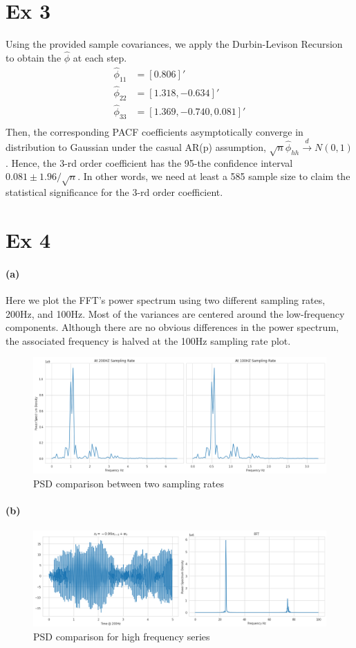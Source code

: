 \documentclass[11pt, letterpaper]{article}
\begin{document}
\section{Ex 3}
Using the provided sample covariances, we apply the Durbin-Levison Recursion to obtain the $\hat{\phi}$ at each step.
\begin{align*}
    \hat{\phi}_{11} &= [0.806]' \\
    \hat{\phi}_{22} &= [1.318, -0.634]' \\
    \hat{\phi}_{33} &= [1.369, -0.740, 0.081]' \\
\end{align*}
Then, the corresponding PACF coefficients asymptotically converge in distribution to Gaussian under the casual AR(p) assumption, $\sqrt{n}\hat{\phi}_{hh} \xrightarrow{d} N(0,1)$. Hence, the 3-rd order coefficient has the 95-the confidence interval $0.081 \pm 1.96/\sqrt{n}$. In other words, we need at least a 585 sample size to claim the statistical significance for the 3-rd order coefficient.

\newpage
\section{Ex 4}
\paragraph{(a)}
Here we plot the FFT's power spectrum using two different sampling rates, 200Hz, and 100Hz. Most of the variances are centered around the low-frequency components. Although there are no obvious differences in the power spectrum, the associated frequency is halved at the 100Hz sampling rate plot.
\begin{figure}[!h]
  \centering
  \includegraphics[width=1.0\textwidth]{4-1.png}
  \captionsetup{justification=centering}
  \caption{PSD comparison between two sampling rates}
\end{figure}

\paragraph{(b)}

\begin{figure}[!h]
  \centering
  \includegraphics[width=1.0\textwidth]{4-2.png}
  \captionsetup{justification=centering}
  \caption{PSD comparison for high frequency series}
\end{figure}
\end{document}

